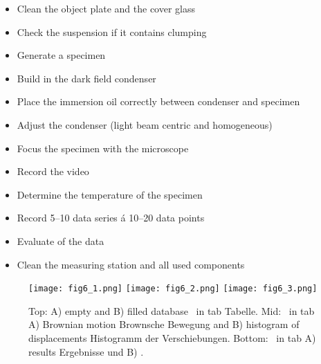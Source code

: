 \documentclass{tudphygp_eng}
\begin{document}
\renewcommand{\labelitemi}{\Large$\square$}
\begin{itemize}

 \item Clean the object plate and the cover glass
 \item Check the suspension if it contains clumping
 \item Generate a specimen
 \item Build in the dark field condenser
 \item Place the immersion oil correctly between condenser and specimen 
 \item Adjust the condenser (light beam centric and homogeneous)
 \item Focus the specimen with the microscope
 \item Record the video 
 \item Determine the temperature of the specimen
 \item Record 5--10 data series {\'a} 10--20 data points
 \item Evaluate of the data 
 \item Clean the measuring station and all used components

\end{itemize}

\begin{figure}[t]
\begin{center}
\texttt{[image: fig6\_1.png]} 
\texttt{[image: fig6\_2.png]} 
\texttt{[image: fig6\_3.png]}
\caption{Top: A) empty and B) filled database \grqq\ in tab \grqq{}Tabelle\grqq{}. Mid: \grqq\ in tab A) Brownian motion \grqq{}Brownsche Bewegung\grqq{} and B) histogram of displacements \grqq{}Histogramm der Verschiebungen\grqq{}. Bottom: \grqq\ in tab A) results \grqq{}Ergebnisse\grqq{} und B)  \grqq.}
\label{fig6}
\end{center}
\end{figure}
\end{document}
